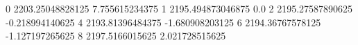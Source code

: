 0 2203.25048828125 7.755615234375
1 2195.494873046875 0.0
2 2195.27587890625 -0.218994140625
4 2193.81396484375 -1.680908203125
6 2194.36767578125 -1.127197265625
8 2197.5166015625 2.021728515625
